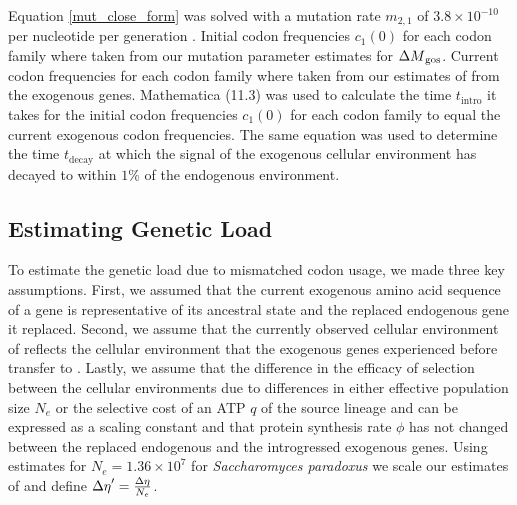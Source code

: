 \documentclass[fleqn,letterpaper]{article}
\begin{document}
Equation \ref{mut_close_form} was solved with a mutation rate $m_{2,1}$ of $3.8\times 10^{-10}$ per nucleotide per generation \citep{lang2008}. 
Initial codon frequencies $c_1(0)$ for each codon family where taken from our mutation parameter estimates for \gossypii ${\Delta M}_\text{gos}$. 
Current codon frequencies for each codon family where taken from our estimates of \DM from the exogenous genes.
Mathematica (11.3) \citep{Mathematica11} was used to calculate the time $t_\text{intro}$ it takes for the initial codon frequencies $c_1(0)$ for each codon family to equal the current exogenous codon frequencies.
The same equation was used to determine the time $t_\text{decay}$ at which the signal of the exogenous cellular environment has decayed to within $1 \%$ of the endogenous environment.

\subsection*{Estimating Genetic Load}

To estimate the genetic load due to mismatched codon usage, we made three key assumptions.
First, we assumed that the current exogenous amino acid sequence of a gene is representative of its ancestral state and the replaced endogenous gene it replaced.
Second, we assume that the currently observed cellular environment of \gossypii reflects the cellular environment that the exogenous genes experienced before transfer to \kluyveri.
Lastly, we assume that the difference in the efficacy of selection between the cellular environments due to differences in either effective population size $N_e$ or the selective cost of an ATP $q$ of the source lineage and \kluyveri can be expressed as a scaling constant and that protein synthesis rate $\phi$ has not changed between the replaced endogenous and the introgressed exogenous genes.
Using estimates for $N_e = 1.36\times10^7$ \citep{wagner2005} for \textit{Saccharomyces paradoxus} we scale our estimates of \DE and define ${\Delta \eta}' = \frac{{\Delta \eta}}{N_e}$.
\end{document}
